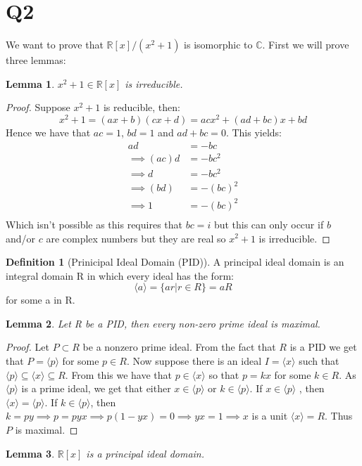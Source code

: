 \documentclass{article}
\newtheorem{lemma}{Lemma}
\theoremstyle{definition}
\newtheorem{definition}{Definition}[section]
\begin{document}
\section*{Q2}
We want to prove that $\mathbb{R}[x]/(x^2 + 1)$ is isomorphic to $\mathbb{C}$. First we will prove three lemmas:
\begin{lemma}
$x^2+1\in\mathbb{R}[x]$ is irreducible.
\end{lemma}
\begin{proof}
Suppose $x^2+1$ is reducible, then:
$$x^2+1=(ax+b)(cx+d)=acx^2+(ad+bc)x+bd$$
Hence we have that $ac=1$, $bd=1$ and $ad+bc=0$. This yields:
\begin{align*}
ad&=-bc\\
\implies (ac)d&=-bc^2\\
\implies d&=-bc^2\\
\implies (bd)&=-(bc)^2\\
\implies 1&=-(bc)^2\\
\end{align*}
Which isn't possible as this requires that $bc=i$ but this can only occur if $b$ and/or $c$ are complex numbers but they are real so $x^2+1$ is irreducible.
\end{proof}
\begin{definition}[Prinicipal Ideal Domain (PID)]
A principal ideal domain is an integral domain R in which every ideal has the form:
$$\langle a \rangle = \{ar|r \in R\} = aR$$
for some a in R.
\end{definition}
\begin{lemma}
Let R be a PID, then every non-zero prime ideal is maximal.
\end{lemma}
\begin{proof}
Let $P\subset R$ be a nonzero prime ideal. From the fact that $R$ is a PID we get that $P=\langle p\rangle$ for some $p\in R$. Now suppose there is an ideal $I= \langle x\rangle$ such that $\langle p\rangle\subseteq \langle x\rangle\subseteq R$. From this we have that $p\in \langle x\rangle$ so that $p=kx$ for some $k\in R$. As $\langle p\rangle$ is a prime ideal, we get that either $x\in\langle p\rangle$ or $k\in\langle p\rangle$. If $x\in \langle p\rangle$ , then $\langle x\rangle=\langle p\rangle$. If $k\in\langle p\rangle$, then $k=py\implies p=pyx\implies p(1-yx)=0\implies yx=1\implies x$ is a unit $\langle x\rangle=R$. Thus $P$ is maximal.
\end{proof}
\begin{lemma}
$\mathbb{R}[x]$ is a principal ideal domain.
\end{lemma}
\end{document}
